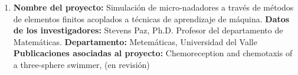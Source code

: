 \begin{spacing}{1.5}
\begin{enumerate}
        \item \textbf{Nombre del proyecto:} Simulación de micro-nadadores a través de métodos de elementos finitos acoplados a técnicas de aprendizaje de máquina. \newline
        \textbf{Datos de los investigadores:} \newline
        Stevens Paz, Ph.D. Profesor del departamento de Matemáticas. \newline
        \textbf{Departamento: } Metemáticas, Universidad del Valle \newline
        \textbf{Publicaciones asociadas al proyecto: } \newline Chemoreception and chemotaxis of a three-sphere swimmer, (en revisión)

    \end{enumerate}

    
    \mylinespacing
    \mylinespacing
    \begin{tightcenter}
    \end{tightcenter}
    \end{spacing}
    